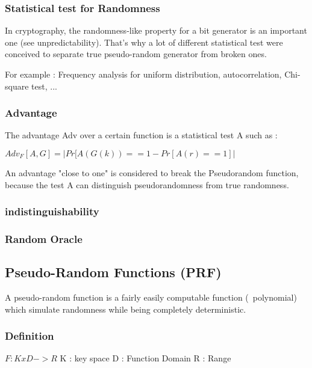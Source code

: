 \subsubsection{Statistical test for Randomness}

In cryptography, the randomness-like property for a bit generator is an important one (see unpredictability). That's why a lot of different statistical test were conceived to separate true pseudo-random generator from broken ones.

For example : Frequency analysis for uniform distribution, autocorrelation, Chi-square test, ...

\subsubsection{Advantage}
The advantage Adv over a certain function is a statistical test A such as : 

$Adv_{F} [A,G] = | Pr[A(G(k)) == 1  - Pr[A(r) == 1] | $
                     
An advantage "close to one" is considered to break the Pseudorandom function, because the test A can distinguish pseudorandomness from true randomness.

\subsubsection{indistinguishability}


\subsubsection{Random Oracle}



\subsection{Pseudo-Random Functions     (PRF)}

A pseudo-random function is a fairly easily computable function (~polynomial) which simulate randomness while being completely deterministic.

\subsubsection{Definition}

$F : KxD ->  R$ 
K : key space
D : Function Domain
R : Range

